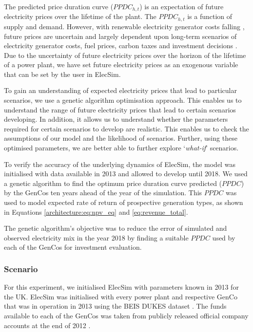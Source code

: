 The predicted price duration curve ($PPDC_{h,t}$) is an expectation of future electricity prices over the lifetime of the plant. The $PPDC_{h,t}$ is a function of supply and demand. However, with renewable electricity generator costs falling  \cite{IRENA2014}, future prices are uncertain and largely dependent upon long-term scenarios of electricity generator costs, fuel prices, carbon taxes and investment decisions \cite{IRENA2014}. Due to the uncertainty of future electricity prices over the horizon of the lifetime of a power plant, we have set future electricity prices as an exogenous variable that can be set by the user in ElecSim. 


To gain an understanding of expected electricity prices that lead to particular scenarios, we use a genetic algorithm optimisation approach. This enables us to understand the range of future electricity prices that lead to certain scenarios developing. In addition, it allows us to understand whether the parameters required for certain scenarios to develop are realistic. This enables us to check the assumptions of our model and the likelihood of scenarios. Further, using these optimised parameters, we are better able to further explore `\textit{what-if}' scenarios.



To verify the accuracy of the underlying dynamics of ElecSim, the model was initialised with data available in 2013 and allowed to develop until 2018. We used a genetic algorithm to find the optimum price duration curve predicted ($PPDC$) by the GenCos ten years ahead of the year of the simulation. This $PPDC$ was used to model expected rate of return of prospective generation types, as shown in Equations \ref{architecture:eq:npv_eq} and \ref{eq:revenue_total}. 

The genetic algorithm's objective was to reduce the error of simulated and observed electricity mix in the year 2018 by finding a suitable $PPDC$ used by each of the GenCos for investment evaluation.

\subsubsection{Scenario}

For this experiment, we initialised ElecSim with parameters known in 2013 for the UK. ElecSim was initialised with every power plant and respective GenCo that was in operation in 2013 using the BEIS DUKES dataset \cite{dukes_511}. The funds available to each of the GenCos was taken from publicly released official company accounts at the end of 2012 \cite{companies_house}.


